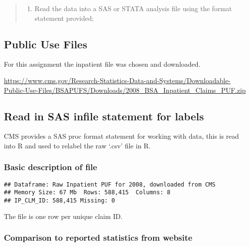\documentclass[]{article}
\providecommand{\tightlist}{%
  \setlength{\itemsep}{0pt}\setlength{\parskip}{0pt}}
\begin{document}
\begin{quote}
\begin{enumerate}
\def\labelenumi{\arabic{enumi}.}
\tightlist
\item
  Read the data into a SAS or STATA analysis file using the format
  statement provided;
\end{enumerate}
\end{quote}

\hypertarget{public-use-files}{%
\subsection{Public Use Files}\label{public-use-files}}

For this assignment the inpatient file was chosen and downloaded.

\url{https://www.cms.gov/Research-Statistics-Data-and-Systems/Downloadable-Public-Use-Files/BSAPUFS/Downloads/2008_BSA_Inpatient_Claims_PUF.zip}

\hypertarget{read-in-sas-infile-statement-for-labels}{%
\subsection{Read in SAS infile statement for
labels}\label{read-in-sas-infile-statement-for-labels}}

CMS provides a SAS proc format statement for working with data, this is
read into R and used to relabel the raw `.csv' file in R.

\hypertarget{basic-description-of-file}{%
\subsubsection{Basic description of
file}\label{basic-description-of-file}}

\begin{verbatim}
## Dataframe: Raw Inpatient PUF for 2008, downloaded from CMS
## Memory Size: 67 Mb  Rows: 588,415  Columns: 8
## IP_CLM_ID: 588,415 Missing: 0
\end{verbatim}

The file is one row per unique claim ID.

\hypertarget{comparison-to-reported-statistics-from-website}{%
\subsubsection{Comparison to reported statistics from
website}\label{comparison-to-reported-statistics-from-website}}
\end{document}
